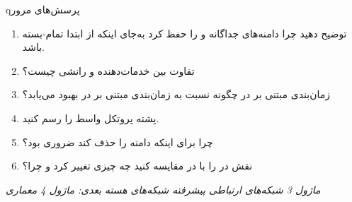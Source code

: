 \begin{CNbox}[unbreakable]{q}{پرسش‌های مرور}

\begin{enumerate}
\def\labelenumi{\arabic{enumi}.}
\tightlist
\item
  توضیح دهید چرا  دامنه‌های جداگانه  و  را حفظ کرد به‌جای اینکه از ابتدا تمام-بسته باشد.
\item
  تفاوت بین  خدمات‌دهنده و  رانشی چیست؟
\item
  زمان‌بندی مبتنی بر  در  چگونه نسبت به زمان‌بندی مبتنی بر  در  بهبود می‌یابد؟
\item
  پشته پروتکل واسط  را رسم کنید.
\item
  چرا  برای اینکه  دامنه  را حذف کند ضروری بود؟
\item
  نقش  در  را با  در  مقایسه کنید  چه چیزی تغییر کرد و چرا؟
\end{enumerate}

\emph{ماژول 3  شبکه‌های ارتباطی پیشرفته  شبکه‌های هسته }\CNbr{}\emph{بعدی: ماژول 4  معماری }

\end{CNbox}

